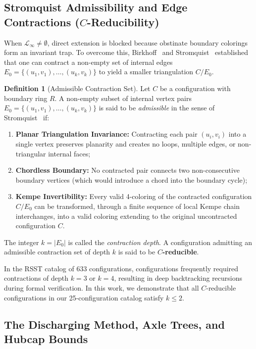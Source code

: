 \documentclass[11pt,a4paper]{article}
\theoremstyle{plain}
\theoremstyle{definition}
\newtheorem{definition}[theorem]{Definition}
\begin{document}
\subsection{Stromquist Admissibility and Edge Contractions (\texorpdfstring{$C$}{C}-Reducibility)}

When $\mathcal{L}_\infty \neq \emptyset$, direct extension is blocked because obstinate boundary colorings form an invariant trap. To overcome this, Birkhoff~\cite{birkhoff1913reducibility} and Stromquist~\cite{stromquist1975some} established that one can contract a non-empty set of internal edges $E_0 = \{(u_1, v_1), \dots, (u_k, v_k)\}$ to yield a smaller triangulation $C / E_0$.

\begin{definition}[Admissible Contraction Set]
Let $C$ be a configuration with boundary ring $R$. A non-empty subset of internal vertex pairs $E_0 = \{(u_1, v_1), \dots, (u_k, v_k)\}$ is said to be \emph{admissible} in the sense of Stromquist~\cite{stromquist1975some} if:
\begin{enumerate}
    \item \textbf{Planar Triangulation Invariance:} Contracting each pair $(u_i, v_i)$ into a single vertex preserves planarity and creates no loops, multiple edges, or non-triangular internal faces;
    \item \textbf{Chordless Boundary:} No contracted pair connects two non-consecutive boundary vertices (which would introduce a chord into the boundary cycle);
    \item \textbf{Kempe Invertibility:} Every valid 4-coloring of the contracted configuration $C / E_0$ can be transformed, through a finite sequence of local Kempe chain interchanges, into a valid coloring extending to the original uncontracted configuration $C$.
\end{enumerate}
The integer $k = |E_0|$ is called the \emph{contraction depth}. A configuration admitting an admissible contraction set of depth $k$ is said to be \textbf{$C$-reducible}.
\end{definition}

In the RSST catalog of 633 configurations, configurations frequently required contractions of depth $k=3$ or $k=4$, resulting in deep backtracking recursions during formal verification. In this work, we demonstrate that all $C$-reducible configurations in our 25-configuration catalog satisfy $k \le 2$.

\subsection{The Discharging Method, Axle Trees, and Hubcap Bounds}
\end{document}
